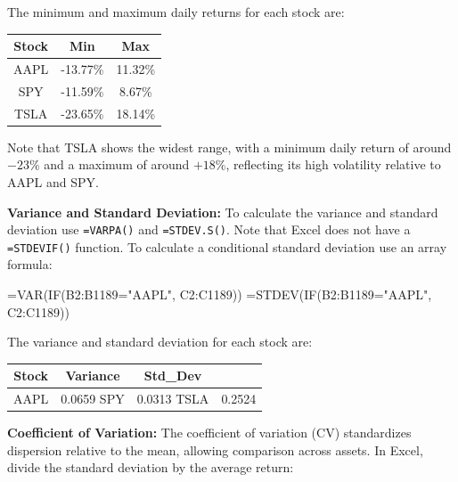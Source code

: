 \documentclass[
  11pt,
  letterpaper,
  DIV=11,
  numbers=noendperiod,
  oneside,
  open=any]{scrreprt}
\newenvironment{Shaded}{\begin{snugshade}}{\end{snugshade}}
\newcommand{\NormalTok}[1]{\textcolor[rgb]{0.00,0.23,0.31}{#1}}
\begin{document}
The minimum and maximum daily returns for each stock are:

\begin{table}
\fontsize{12.0pt}{14.0pt}\selectfont
\begin{tabular*}{\linewidth}{@{\extracolsep{\fill}}ccc}
\toprule
{\bfseries Stock} & {\bfseries Min} & {\bfseries Max} \\ 
\midrule\addlinespace[2.5pt]
AAPL & -13.77\% & 11.32\% \\ 
SPY & -11.59\% & 8.67\% \\ 
TSLA & -23.65\% & 18.14\% \\ 
\bottomrule
\end{tabular*}
\end{table}

Note that TSLA shows the widest range, with a minimum daily return of
around \(-23\%\) and a maximum of around \(+18\%\), reflecting its high
volatility relative to AAPL and SPY.

\textbf{Variance and Standard Deviation:} To calculate the variance and
standard deviation use \texttt{=VARPA()} and \texttt{=STDEV.S()}. Note
that Excel does not have a \texttt{=STDEVIF()} function. To calculate a
conditional standard deviation use an array formula:

\begin{Shaded}
\begin{Highlighting}[]
\NormalTok{=VAR(IF(B2:B1189="AAPL", C2:C1189))}
\NormalTok{=STDEV(IF(B2:B1189="AAPL", C2:C1189))}
\end{Highlighting}
\end{Shaded}

The variance and standard deviation for each stock are:

\begin{table}
\fontsize{12.0pt}{14.0pt}\selectfont
\begin{tabular*}{\linewidth}{@{\extracolsep{\fill}}ccc}
\toprule
{\bfseries Stock} & {\bfseries Variance} & {\bfseries Std\_Dev} \\ 
\midrule\addlinespace[2.5pt]
AAPL & 0.0659%
SPY & 0.0313%
TSLA & 0.2524%
\bottomrule
\end{tabular*}
\end{table}

\textbf{Coefficient of Variation:} The coefficient of variation (CV)
standardizes dispersion relative to the mean, allowing comparison across
assets. In Excel, divide the standard deviation by the average return:
\end{document}
